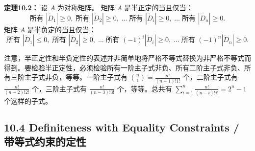 \begin{translation}
\textbf{定理10.2：} 设 $A$ 为对称矩阵。
矩阵 $A$ 是半正定的当且仅当：
\[
\text{所有 } |\tilde{D}_1| \geq 0,\; \text{所有 } |\tilde{D}_2| \geq 0,\; \ldots\; \text{所有 } |\tilde{D}_i| \geq 0,\; \ldots\; \text{所有 } |\tilde{D}_n| \geq 0.
\]
矩阵 $A$ 是半负定的当且仅当：
\[
\text{所有 } |\tilde{D}_1| \leq 0,\; \text{所有 } |\tilde{D}_2| \geq 0,\; \ldots\; \text{所有 } (-1)^i|\tilde{D}_i| \geq 0,\; \ldots\; \text{所有 } (-1)^n|\tilde{D}_n| \geq 0.
\]

注意，半正定性和半负定性的表述并非简单地将严格不等式替换为非严格不等式而得到。要检验半正定性，必须检验所有一阶主子式非负、所有二阶主子式非负、所有三阶主子式非负，等等。一阶主子式有 $\binom{n}{1} = \frac{n!}{(n-1)!1!}$ 个，二阶主子式有 $\frac{n!}{(n-2)!2!}$ 个，三阶主子式有 $\frac{n!}{(n-3)!3!}$ 个，等等。总共有 $\sum_{i=1}^n \frac{n!}{(n-i)!i!} = 2^n - 1$ 个这样的子式。
\end{translation}

\subsection{10.4 Definiteness with Equality Constraints / 带等式约束的定性}

